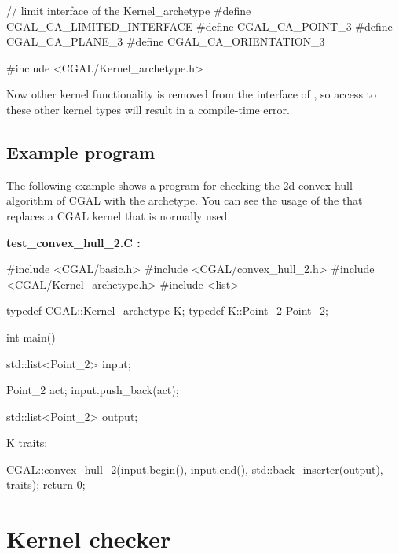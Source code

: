 \ccHtmlLinksOff

\begin{ccExampleCode}
// limit interface of the Kernel_archetype
#define CGAL_CA_LIMITED_INTERFACE
#define CGAL_CA_POINT_3
#define CGAL_CA_PLANE_3
#define CGAL_CA_ORIENTATION_3

#include <CGAL/Kernel_archetype.h>
\end{ccExampleCode}

\ccHtmlLinksOn

Now other kernel functionality is removed from the interface of , so access to these
other kernel types will result in a compile-time error.

\subsection{Example program}

The following example shows a program for checking the 2d convex hull algorithm of CGAL with
the archetype. You can see the usage of the  that replaces a CGAL kernel that
is normally used.

\ccHtmlLinksOff

{\bf test\_convex\_hull\_2.C :}

\begin{ccExampleCode}
#include <CGAL/basic.h>
#include <CGAL/convex_hull_2.h>
#include <CGAL/Kernel_archetype.h>
#include <list>

typedef CGAL::Kernel_archetype      K;
typedef K::Point_2                  Point_2;

int main()
{
  std::list<Point_2> input;
  
  Point_2 act;
  input.push_back(act);

  std::list<Point_2> output;

  K  traits;

  CGAL::convex_hull_2(input.begin(), input.end(), std::back_inserter(output), traits);		        
  return 0;
}
\end{ccExampleCode}

\ccHtmlLinksOn

\section{Kernel checker}

